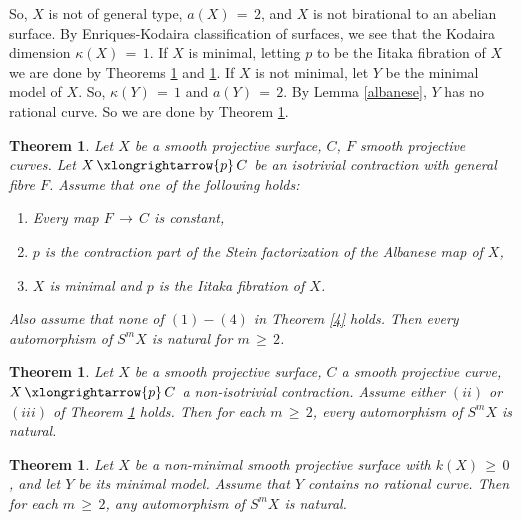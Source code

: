 \documentclass[12pt,reqno]{amsart}
\newtheorem{theorem}[lemma]{Theorem}
\theoremstyle{definition}
\numberwithin{equation}{section}
\begin{document}
  So, $X$ is not of general type, $a(X)\,=\,2$, and $X$ is not birational to an abelian surface. By Enriques-Kodaira classification of surfaces, we see that the Kodaira dimension $\kappa(X)\,=\,1.$ If $X$ is minimal, letting $p$ to be the Iitaka fibration of $X$ we are done by Theorems \ref{isotrivial} and \ref{non-isotrivial}. If $X$ is not minimal, let $Y$ be the minimal model of $X$. So, $\kappa(Y)\,=\,1$ and $a(Y)\,=\,2$. By Lemma \ref{albanese}, $Y$ has no rational curve. So we are done by Theorem \ref{nonminimal}.


\begin{theorem}\label{isotrivial}
Let $X$ be a smooth projective surface, $C$, $F$ smooth projective curves. Let $X\,\xlongrightarrow{p}\,C$ be an isotrivial contraction with general fibre $F$. Assume that one of the following holds:
\begin{enumerate}
    \item[$(i)$] Every map $F\,\longrightarrow\, C$ is constant,
    \item [$(ii)$]$p$ is the contraction part of the Stein factorization of the Albanese map of $X$,
    \item[$(iii)$] $X$ is minimal and $p$ is the Iitaka fibration of $X$.
\end{enumerate}  Also assume that none of $(1)-(4)$ in Theorem \ref{4} holds.  Then every automorphism of $S^{m}X$ is natural for $m\,\geq\,2$. 
\end{theorem}

\begin{theorem}\label{non-isotrivial}
Let $X$ be a smooth projective surface, $C$ a smooth projective curve, $X\,\xlongrightarrow{p}\,C$ a non-isotrivial contraction. Assume either $(ii)$ or $(iii)$ of Theorem \ref{isotrivial} holds. Then for each $m\,\geq\,2$, every automorphism of $S^{m}X$ is natural.
\end{theorem}

\begin{theorem}\label{nonminimal}
Let $X$ be a non-minimal smooth projective surface with $k(X)\,\geq\,0$, and let $Y$ be its minimal model. Assume that $Y$ contains no rational curve. Then for each $m\,\geq\, 2$, any automorphism of $S^{m}X$ is natural.     
\end{theorem}
\end{document}
